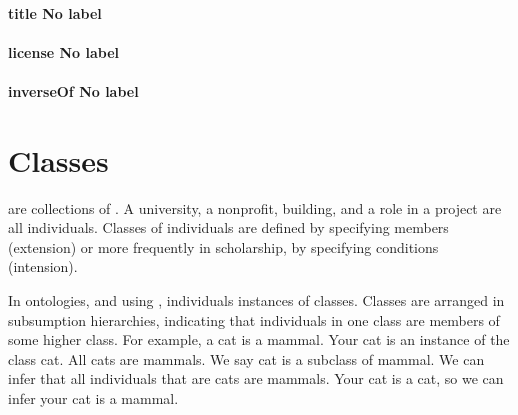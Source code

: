 \documentclass[letterpaper,10pt,english]{sphinxmanual}
\begin{document}
\subsubsection{title \sphinxhyphen{} No label}
\label{\detokenize{doc-title:title-no-label}}\label{\detokenize{doc-title:index-0}}\label{\detokenize{doc-title::doc}}\begin{quote}

\ignorespaces \end{quote}


\subsubsection{license \sphinxhyphen{} No label}
\label{\detokenize{doc-license:license-no-label}}\label{\detokenize{doc-license:index-0}}\label{\detokenize{doc-license::doc}}\begin{quote}

\ignorespaces \end{quote}


\subsubsection{inverseOf \sphinxhyphen{} No label}
\label{\detokenize{doc-inverseOf:inverseof-no-label}}\label{\detokenize{doc-inverseOf:index-0}}\label{\detokenize{doc-inverseOf::doc}}

\chapter{Classes}
\label{\detokenize{classes:classes}}\label{\detokenize{classes::doc}}
\sphinxAtStartPar
{} are collections of .  A university, a nonprofit, building,
and a role in a project are
all individuals.  Classes of individuals are defined by specifying members
(extension) or more frequently
in scholarship, by specifying conditions (intension).

\sphinxAtStartPar
In ontologies, and using {\hyperref[\detokenize{glossary:glossary}]{}}, individuals
instances of classes. Classes are arranged
in subsumption hierarchies, indicating that individuals in one class are members of some
higher class.  For example, a cat is a mammal.  Your cat is an instance of the
class cat.  All cats are mammals.  We say cat is a subclass of mammal.  We can infer
that all individuals that are
cats are mammals.  Your cat is a cat, so we can infer your cat is a mammal.
\end{document}
